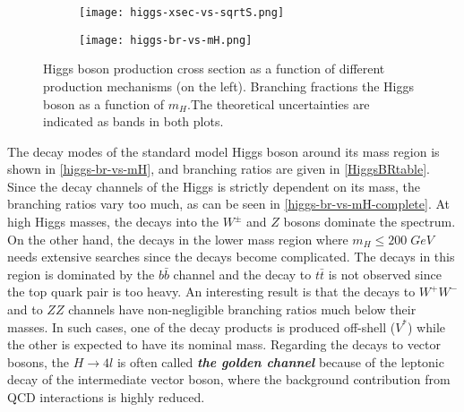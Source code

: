 \begin{figure*}[ht]
        \centering
        \begin{subfigure}[b]{0.475\textwidth}
            \centering
            \texttt{[image: higgs-xsec-vs-sqrtS.png]}
            \vspace{-0.75cm}
            \label{higgs-xsec-vs-sqrtS}
        \end{subfigure}
        \hspace{0.2cm}
        \begin{subfigure}[b]{0.475\textwidth}  
            \centering 
            \texttt{[image: higgs-br-vs-mH.png]}
            \vspace{-0.75cm}
            \label{higgs-br-vs-mH}
        \end{subfigure}
        \caption[Higgs boson production cross section as a function of different production mechanisms (on the left). Branching fractions the Higgs boson as a function of $m_H$ .The theoretical uncertainties are indicated as bands in both plots.]
        {\small Higgs boson production cross section as a function of different production mechanisms\cite{higg-phen-3} (on the left). Branching fractions the Higgs boson as a function of $m_H$\cite{higgs-br-vs-mH}.The theoretical uncertainties are indicated as bands in both plots.}
\end{figure*}

The decay modes of the standard model Higgs boson around its mass region is shown in \autoref{higgs-br-vs-mH}, and branching ratios are given in \autoref{HiggsBRtable}. Since the decay channels of the Higgs is strictly dependent on its mass, the branching ratios vary too much, as can be seen in \autoref{higgs-br-vs-mH-complete}. At high Higgs masses, the decays into the $W^\pm$ and $Z$ bosons dominate the spectrum.  On the other hand, the decays in the lower mass region where $m_H \le 200\; GeV$ needs extensive searches since the decays become complicated. The decays in this region is dominated by the $b\bar b$ channel and the decay to $t\bar t$ is not observed since the top quark pair is too heavy. An interesting result is that the decays to $W^+W^-$ and to $ZZ$ channels have non-negligible branching ratios much below their masses. In such cases, one of the decay products is produced off-shell ($V^*$) while the other is expected to have its nominal mass. Regarding the decays to vector bosons, the $H\rightarrow 4l$ is often called \emph{\textbf{the golden channel}} because of the leptonic decay of the intermediate vector boson, where the background contribution from QCD interactions is highly reduced.

